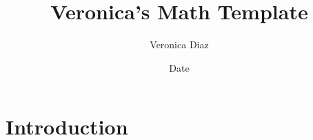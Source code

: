 \documentclass{article}
\title{Veronica's Math Template}
\author{Veronica Diaz}
\date{Date}
\begin{document}
\maketitle

\section{Introduction}
\end{document}

